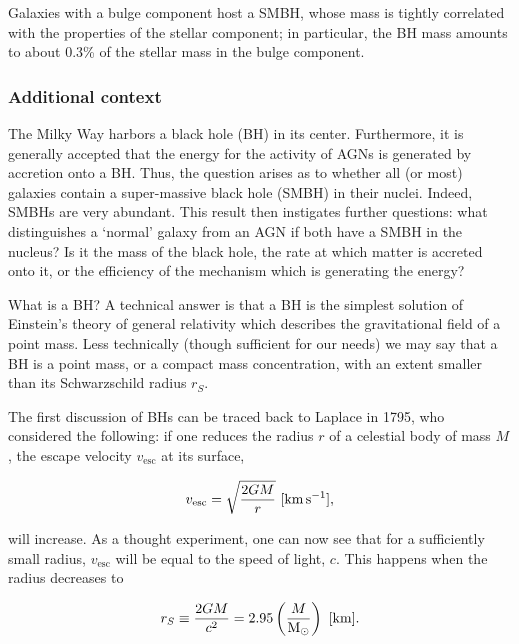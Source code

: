 \documentclass[a4paper,11pt]{article}
\begin{document}
Galaxies with a bulge component host a SMBH, whose mass is tightly correlated with the properties of the stellar component; in particular, the BH mass amounts to about 0.3\% of the stellar mass in the bulge component.

\subsubsection{Additional context}

The Milky Way harbors a black hole (BH) in its center. Furthermore, it is generally accepted that the energy for the activity of AGNs is generated by accretion onto a BH. Thus, the question arises as to whether all (or most) galaxies contain a super-massive black hole (SMBH) in their nuclei. Indeed, SMBHs are very abundant. This result then instigates further questions: what distinguishes a `normal' galaxy from an AGN if both have a SMBH in the nucleus? Is it the mass of the black hole, the rate at which matter is accreted onto it, or the efficiency of the mechanism which is generating the energy?

{\noindent}What is a BH? A technical answer is that a BH is the simplest solution of Einstein’s theory of general relativity which describes the gravitational field of a point mass. Less technically (though sufficient for our needs) we may say that a BH is a point mass, or a compact mass concentration, with an extent smaller than its Schwarzschild radius $r_S$.

{\noindent}The first discussion of BHs can be traced back to Laplace in 1795, who considered the following: if one reduces the radius $r$ of a celestial body of mass $M$, the escape velocity $v_\mathrm{esc}$ at its surface,

\begin{align*}
    v_\mathrm{esc} = \sqrt{\frac{2GM}{r}} ~ [{\rm km\,s^{-1}}],
\end{align*}

{\noindent}will increase. As a thought experiment, one can now see that for a sufficiently small radius, $v_\mathrm{esc}$ will be equal to the speed of light, $c$. This happens when the radius decreases to

\begin{align*}
    r_S \equiv \frac{2GM}{c^2} = 2.95\left(\frac{M}{{\rm M_\odot}}\right) ~ [{\rm km}].
\end{align*}
\end{document}
